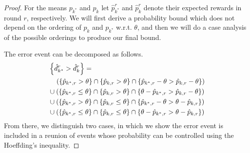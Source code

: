 \begin{proof}
For the means $p_{k^*}$ and $p_k$ let $\hat{p}^r_{k^*}$ and $\hat{p}^r_k$ denote their
expected rewards in round $r$, respectively.
We will first derive a probability bound which does not depend on the
ordering of $p_k$ and $p_{k^*}$ w.r.t. $\theta$, and then we will do a case
analysis of the possible orderings to produce our final bound.

The error event can be decomposed as follows. 
\begin{align*}
&\Set{\hat{d}^r_{k^*} > \hat{d}^r_k} =
\\
	&~~~\left( \Set{\hat{p}_{{k^*},r} > \theta}
		\cap \Set{\hat{p}_{k,r} > \theta}
		\cap \Set{\hat{p}_{{k^*},r} - \theta > \hat{p}_{k,r} - \theta}
		\right) \\
	&\cup \left(
		\Set{\hat{p}_{{k^*},r} \le \theta}
		\cap \Set{\hat{p}_{k,r} > \theta}
		\cap \Set{\theta - \hat{p}_{{k^*},r} > \hat{p}_{k,r} - \theta}
		\right) \\
	&\cup \left(
		\Set{\hat{p}_{{k^*},r} > \theta}
		\cap \Set{\hat{p}_{k,r} \le \theta}
		\cap \Set{\hat{p}_{{k^*},r} - \theta > \theta - \hat{p}_{k,r}}
		\right) \\
	&\cup \left(
		\Set{\hat{p}_{{k^*},r} \le \theta}
		\cap \Set{\hat{p}_{k,r} \le \theta}
		\cap \Set{\theta - \hat{p}_{{k^*},r} > \theta - \hat{p}_{k,r}}
		\right)
\end{align*}
From there, we distinguish two cases, in which we show the error event is included in a reunion of events whose probability can be controlled using the Hoeffding's inequality. 


\end{proof}
